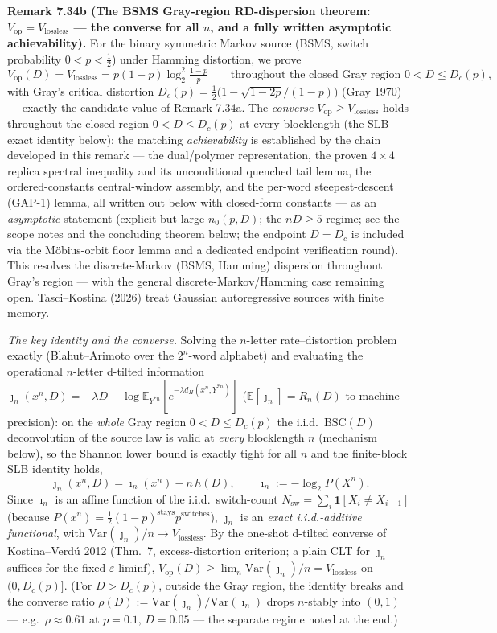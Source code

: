 \documentclass[
]{article}
\begin{document}
\textbf{Remark 7.34b (The BSMS Gray-region RD-dispersion theorem:
$V_{\mathrm{op}}=V_{\mathrm{lossless}}$ --- the converse for all $n$, and a fully written asymptotic
achievability).} For the binary symmetric Markov
source (BSMS, switch probability $0<p<\tfrac12$) under Hamming distortion, we prove
\[
  V_{\mathrm{op}}(D)= V_{\mathrm{lossless}}=p(1-p)\log_2^2\tfrac{1-p}p
  \qquad\text{throughout the closed Gray region }0<D\le D_c(p),
\]
with Gray's critical distortion $D_c(p)=\tfrac12\big(1-\sqrt{1-2p}/(1-p)\big)$ (Gray 1970) --- exactly the candidate value of Remark 7.34a. The \emph{converse}
$V_{\mathrm{op}}\ge V_{\mathrm{lossless}}$ holds throughout the closed region $0<D\le D_c(p)$ at every
blocklength (the SLB-exact identity below); the matching \emph{achievability} is established by the
chain developed in this remark --- the dual/polymer representation, the proven $4\times4$ replica
spectral inequality and its unconditional quenched tail lemma, the ordered-constants central-window
assembly, and the per-word steepest-descent (GAP-1) lemma, all written out below with closed-form
constants --- as an \emph{asymptotic} statement (explicit but large $n_0(p,D)$; the $nD\ge5$ regime;
see the scope notes and the concluding theorem below; the endpoint $D=D_c$ is included via the
M\"obius-orbit floor lemma and a dedicated endpoint verification round). This resolves the
discrete-Markov (BSMS,
Hamming) dispersion throughout Gray's region --- with the general discrete-Markov/Hamming case remaining open. Tasci--Kostina (2026)
treat Gaussian autoregressive sources with finite memory.

\emph{The key identity and the converse.} Solving the $n$-letter rate--distortion problem exactly
(Blahut--Arimoto over the $2^n$-word alphabet) and evaluating the operational $n$-letter d-tilted
information $\jmath_n(x^n,D)=-\lambda D-\log\mathbb{E}_{Y^{*n}}[e^{-\lambda d_H(x^n,Y^{*n})}]$
($\mathbb{E}[\jmath_n]=R_n(D)$ to machine precision): on the \emph{whole} Gray region $0<D\le D_c(p)$
the i.i.d.\ $\mathrm{BSC}(D)$ deconvolution of the source law is valid at \emph{every} blocklength $n$
(mechanism below), so the Shannon lower bound is exactly tight for all $n$ and the finite-block SLB
identity holds,
\[
  \jmath_n(x^n,D)=\imath_n(x^n)-n\,h(D),\qquad \imath_n:=-\log_2 P(X^n).
\]
Since $\imath_n$ is an affine function of the i.i.d.\ switch-count $N_{\mathrm{sw}}=\sum_i\mathbf 1[X_i\ne X_{i-1}]$
(because $P(x^n)=\tfrac12(1-p)^{\mathrm{stays}}p^{\mathrm{switches}}$), $\jmath_n$ is an \emph{exact
i.i.d.-additive functional}, with $\mathrm{Var}(\jmath_n)/n\to V_{\mathrm{lossless}}$. By the
one-shot d-tilted converse of Kostina--Verd\'u 2012 (Thm.~7, excess-distortion criterion; a plain CLT
for $\jmath_n$ suffices for the fixed-$\varepsilon$ liminf), $V_{\mathrm{op}}(D)\ge\lim_n\mathrm{Var}(\jmath_n)/n=V_{\mathrm{lossless}}$
on $(0,D_c(p)]$. (For $D>D_c(p)$, outside the Gray region, the identity breaks and the converse ratio
$\rho(D):=\mathrm{Var}(\jmath_n)/\mathrm{Var}(\imath_n)$ drops $n$-stably into $(0,1)$ --- e.g.\
$\rho\approx0.61$ at $p=0.1,\,D=0.05$ --- the separate regime noted at the end.)
\end{document}
